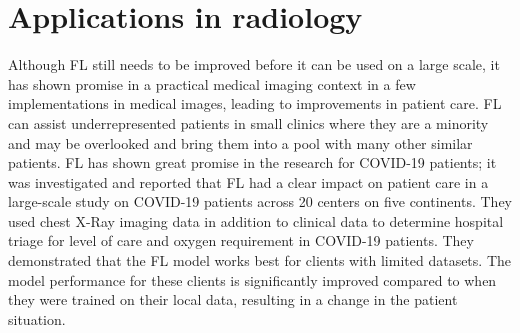 


\section{Applications in radiology}

Although FL still needs to be improved before it can be used on a large scale, it has shown promise in a practical medical imaging context in a few implementations in medical images, leading to improvements in patient care.  FL can assist underrepresented patients in small clinics where they are a minority and may be overlooked and bring them into a pool with many other similar patients. FL has shown great promise in the research for COVID-19 patients; it was investigated and reported that FL had a clear impact on patient care in a large-scale study on COVID-19 patients across 20 centers on five continents\cite{flores2021federated}. They used chest X-Ray imaging data in addition to clinical data to determine hospital triage for level of care and oxygen requirement in COVID-19 patients. They demonstrated that the FL model works best for clients with limited datasets. The model performance for these clients is significantly improved compared to when they were trained on their local data, resulting in a change in the patient situation. 

